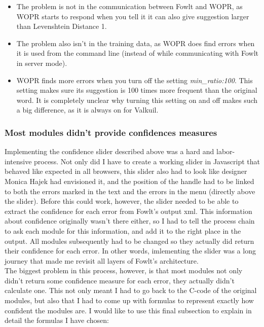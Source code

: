 \documentclass[12pt]{article}
\begin{document}
\begin{itemize}

\item The problem is not in the communication between Fowlt and WOPR, as WOPR starts to respond when you tell it it can also give suggestion larger than Levenshtein Distance 1.
\item The problem also isn't in the training data, as WOPR does find errors when it is used from the command line (instead of while communicating with Fowlt in server mode).
\item WOPR finds more errors when you turn off the setting \emph{min\_ratio:100}. This setting makes sure its suggestion is 100 times more frequent than the original word. It is completely unclear why turning this setting on and off makes such a big difference, as it is always on for Valkuil.

\end{itemize}

\subsubsection{Most modules didn't provide confidences measures} \label{formulas}
Implementing the confidence slider described above was a hard and labor-intensive process. Not only did I have to create a working slider in Javascript that behaved like expected in all browsers, this slider also had to look like designer Monica Hajek had envisioned it, and the position of the handle had to be linked to both the errors marked in the text and the errors in the menu (directly above the slider). Before this could work, however, the slider needed to be able to extract the confidence for each error from Fowlt's output xml. This information about confidence originally wasn't there either, so I had to tell the process chain to ask each module for this information, and add it to the right place in the output. All modules subsequently had to be changed so they actually did return their confidence for each error. In other words, imlementing the slider was a long journey that made me revisit all layers of Fowlt's architecture.\\\indent
The biggest problem in this process, however, is that most modules not only didn't return some confidence measure for each error, they actually didn't calculate one. This not only meant I had to go back to the C-code of the original modules, but also that I had to come up with formulas to represent exactly how confident the modules are. I would like to use this final subsection to explain in detail the formulas I have chosen:
\end{document}
